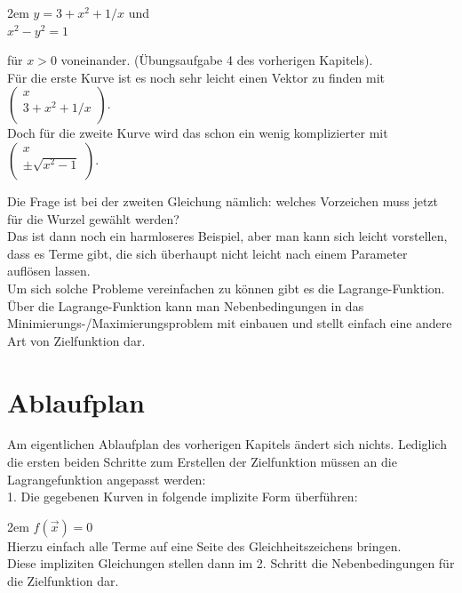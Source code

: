 \documentclass[11pt,final]{scrreprt}
\begin{document}
\begingroup
\leftskip2em 
$ y=3+x^2+1/x $ und\\
$ x^2-y^2=1 $
\par	
\endgroup

für $x>0$ voneinander. (Übungsaufgabe 4 des vorherigen Kapitels).\\

Für die erste Kurve ist es noch sehr leicht einen Vektor zu finden mit\\ 
$\left(\begin{matrix}
x\\ 3+x^2+1/x\\
\end{matrix}\right)$.\\ 

Doch für die zweite Kurve wird das schon ein wenig komplizierter mit\\
$\left(\begin{matrix}
x\\ \pm\sqrt{x^2-1}\\
\end{matrix}\right)$.

Die Frage ist bei der zweiten Gleichung nämlich: welches Vorzeichen muss jetzt für die Wurzel gewählt werden?\\
Das ist dann noch ein harmloseres Beispiel, aber man kann sich leicht vorstellen, dass es Terme gibt, die sich überhaupt nicht leicht nach einem Parameter auflösen lassen.\\
Um sich solche Probleme vereinfachen zu können gibt es die Lagrange-Funktion. Über die Lagrange-Funktion kann man Nebenbedingungen in das Minimierungs-/Maximierungsproblem mit einbauen und stellt einfach eine andere Art von Zielfunktion dar.\\

\section{Ablaufplan}

Am eigentlichen Ablaufplan des vorherigen Kapitels ändert sich nichts. Lediglich die ersten beiden Schritte zum Erstellen der Zielfunktion müssen an die Lagrangefunktion angepasst werden:\\

1. Die gegebenen Kurven in folgende implizite Form überführen:

\begingroup
\leftskip2em 
$f(\overrightarrow{x})=0$\\
Hierzu einfach alle Terme auf eine Seite des Gleichheitszeichens bringen.\\
Diese impliziten Gleichungen stellen dann im 2. Schritt die Nebenbedingungen für die Zielfunktion dar.\\
\par	
\endgroup
\end{document}
